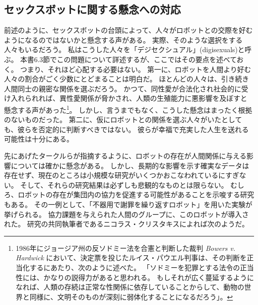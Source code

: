 \documentclass[paper=a4,book,openany]{jlreq}
\begin{document}
\subsection{セックスボットに関する懸念への対応}

前述のように、セックスボットの台頭によって、人々がロボットとの交際を好むようになるのではないかと懸念する声がある。
実際、そのような選択をする人々もいるだろう。
私はこうした人々を「デジセクシュアル」(digisexuals)と呼ぶ。
本書6.3節でこの問題について詳述するが、ここではその要点を述べておく。
つまり、それほど心配する必要はない。
第一に、ロボットを人間より好む人々の割合がごく少数にとどまることは明白だ。
ほとんどの人々は、引き続き人間同士の親密な関係を選ぶだろう。
かつて、同性愛が合法化され社会的に受け入れられれば、異性愛関係が脅かされ、人類の生殖能力に悪影響を及ぼすと懸念する声があった\footnote{ 1986年にジョージア州の反ソドミー法を合憲と判断した裁判 \emph{Bowers v. Hardwick} において、決定票を投じたルイス・パウエル判事は、その判断を正当化するにあたり、次のように述べた。
「ソドミーを犯罪とする法令の正当性には、かなりの説得力があると思われる。
もしそれが広く蔓延するようになれば、人類の存続は正常な性関係に依存していることからして、動物の世界と同様に、文明そのものが深刻に弱体化することになるだろう」。}。
しかし、言うまでもなく、こうした懸念はまったく根拠のないものだった。
第二に、仮にロボットとの関係を選ぶ人々がいたとしても、彼らを否定的に判断すべきではない。
彼らが幸福で充実した人生を送れる可能性は十分にある。

先にあげたタークルらが指摘するように、ロボットの存在が人間関係に与える影響については確かに懸念がある。
しかし、長期的な影響を示す確実なデータは存在せず、現在のところは小規模な研究がいくつかおこなわれているにすぎない。
そして、それらの研究結果は必ずしも悲観的なものとは限らない。
むしろ、ロボットの存在が集団内の協力を促進する可能性があることを示唆する研究もある\citep{traeger20:_vulner_robot_posit_shape_human}。
その一例として、「不器用で謝罪を繰り返すロボット」を用いた実験が挙げられる。
協力課題を与えられた人間のグループに、このロボットが導入された。
研究の共同執筆者であるニコラス・クリスタキスによれば次のようだ。
\end{document}
